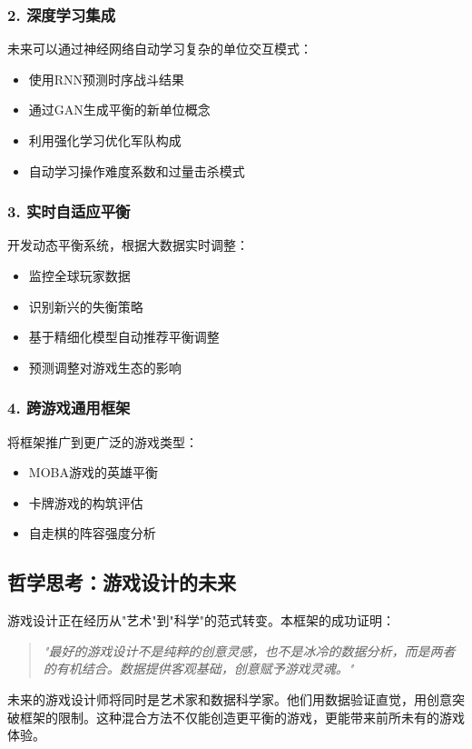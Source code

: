 \documentclass[a4paper,12pt]{article}
\begin{document}
\subsubsection{2. 深度学习集成}
未来可以通过神经网络自动学习复杂的单位交互模式：
\begin{itemize}
\item 使用RNN预测时序战斗结果
\item 通过GAN生成平衡的新单位概念
\item 利用强化学习优化军队构成
\item 自动学习操作难度系数和过量击杀模式
\end{itemize}

\subsubsection{3. 实时自适应平衡}
开发动态平衡系统，根据大数据实时调整：
\begin{itemize}
\item 监控全球玩家数据
\item 识别新兴的失衡策略
\item 基于精细化模型自动推荐平衡调整
\item 预测调整对游戏生态的影响
\end{itemize}

\subsubsection{4. 跨游戏通用框架}
将框架推广到更广泛的游戏类型：
\begin{itemize}
\item MOBA游戏的英雄平衡
\item 卡牌游戏的构筑评估
\item 自走棋的阵容强度分析
\end{itemize}

\subsection{哲学思考：游戏设计的未来}

游戏设计正在经历从"艺术"到"科学"的范式转变。本框架的成功证明：

\begin{quote}
\textit{"最好的游戏设计不是纯粹的创意灵感，也不是冰冷的数据分析，而是两者的有机结合。数据提供客观基础，创意赋予游戏灵魂。"}
\end{quote}

未来的游戏设计师将同时是艺术家和数据科学家。他们用数据验证直觉，用创意突破框架的限制。这种混合方法不仅能创造更平衡的游戏，更能带来前所未有的游戏体验。
\end{document}
